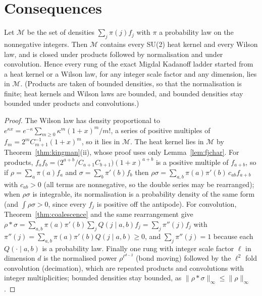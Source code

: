 \section{Consequences}

\begin{corollary}\label{cor:Mclosed}
Let $\mathcal M$ be the set of densities $\sum_j\pi(j)f_j$ with $\pi$ a probability law on the nonnegative integers. Then $\mathcal M$ contains every SU(2) heat kernel and every Wilson law, and is closed under products followed by normalisation and under convolution. Hence every rung of the exact Migdal Kadanoff ladder started from a heat kernel or a Wilson law, for any integer scale factor and any dimension, lies in $\mathcal M$. (Products are taken of bounded densities, so that the normalisation is finite; heat kernels and Wilson laws are bounded, and bounded densities stay bounded under products and convolutions.)
\end{corollary}

\begin{proof}
The Wilson law has density proportional to $e^{\kappa x}=e^{-\kappa}\sum_{m\ge0}\kappa^m(1+x)^m/m!$, a series of positive multiples of $f_m=2^mC_{m+1}^{-1}(1+x)^m$, so it lies in $\mathcal M$. The heat kernel lies in $\mathcal M$ by Theorem~\ref{thm:kingman}(ii), whose proof uses only Lemma~\ref{lem:fjchar}. For products, $f_af_b=\big(2^{a+b}/C_{a+1}C_{b+1}\big)(1+x)^{a+b}$ is a positive multiple of $f_{a+b}$, so if $\rho=\sum_a\pi(a)f_a$ and $\sigma=\sum_b\pi'(b)f_b$ then $\rho\sigma=\sum_{a,b}\pi(a)\pi'(b)\,c_{ab}f_{a+b}$ with $c_{ab}>0$ (all terms are nonnegative, so the double series may be rearranged); when $\rho\sigma$ is integrable, its normalisation is a probability density of the same form (and $\int\rho\sigma>0$, since every $f_j$ is positive off the antipode). For convolution, Theorem~\ref{thm:coalescence} and the same rearrangement give $\rho*\sigma=\sum_{a,b}\pi(a)\pi'(b)\sum_jQ(j\mid a,b)f_j=\sum_j\pi''(j)f_j$ with $\pi''(j)=\sum_{a,b}\pi(a)\pi'(b)Q(j\mid a,b)\ge0$, and $\sum_j\pi''(j)=1$ because each $Q(\cdot\mid a,b)$ is a probability law. Finally one rung with integer scale factor $\ell$ in dimension $d$ is the normalised power $\rho^{\ell^{d-2}}$ (bond moving) followed by the $\ell^2$ fold convolution (decimation), which are repeated products and convolutions with integer multiplicities; bounded densities stay bounded, as $\|\rho*\sigma\|_\infty\le\|\rho\|_\infty$.
\end{proof}

